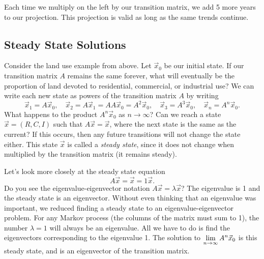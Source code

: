 \begin{example}
\begin{center}
\end{center}
Each time we multiply on the left by our transition matrix, we add 5 more years to our projection. This projection is valid as long as the same trends continue. 
\end{example}










\subsection{Steady State Solutions}


Consider the land use example from above.  Let $\vec x_0$ be our initial state. If our transition matrix $A$ remains the same forever, what will eventually be the proportion of land devoted to residential, commercial, or industrial use? We can write each new state as powers of the transition matrix $A$ by writing 
$$\vec x_{1} = A \vec x_{0}, \quad \vec x_{2}=A \vec x_{1} = AA\vec x_{0} = A^2\vec x_{0},\quad \vec x_{3}= A^3\vec x_{0},\quad \vec x_{n}= A^n\vec x_{0}.$$  What happens to the product $A^n\vec x_0$ as $n\to \infty$? Can we reach a state $\vec x = (R,C,I)$ such that $A \vec x=\vec x$, where the next state is the same as the current? If this occurs, then any future transitions will not change the state either. This state $\vec x$ is called a \emph{steady state}, since it does not change when multiplied by the transition matrix (it remains steady). 

Let's look more closely at the steady state equation $$A\vec x = \vec x = 1\vec x.$$ 
Do you see the eigenvalue-eigenvector notation $A\vec x = \lambda \vec x$? 
The eigenvalue is 1 and the steady state is an eigenvector. 
Without even thinking that an eigenvalue was important, we reduced finding a steady state to an eigenvalue-eigenvector problem. 
For any Markov process (the columns of the matrix must sum to 1), the number $\lambda = 1$ will always be an eigenvalue. All we have to do is find the eigenvectors corresponding to the eigenvalue 1. 
The solution to $\displaystyle\lim_{n\to\infty}A^n \vec x_0$ is this steady state, and is an eigenvector of the transition matrix.
 
